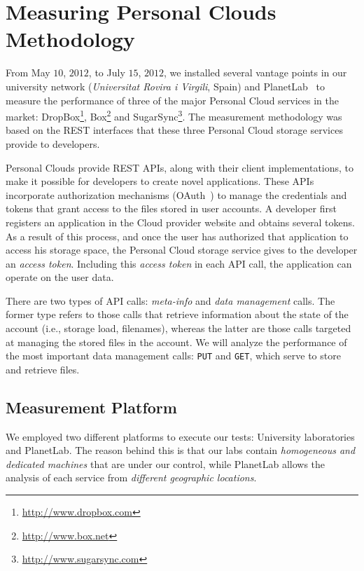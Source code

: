\chapter{Measuring Personal Clouds Methodology}

From May $10$, $2012$, to July $15$, $2012$, we installed several
vantage points in our university network (\textit{Universitat
Rovira i Virgili}, Spain) and PlanetLab~\cite{planetlab}  
to measure the performance of three of the major Personal Cloud services in the market: DropBox\footnote{\url{http://www.dropbox.com}}, Box\footnote{\url{http://www.box.net}} 
and SugarSync\footnote{\url{http://www.sugarsync.com}}. The measurement methodology was based on the REST interfaces that these three Personal Cloud storage services provide to developers.

Personal Clouds provide REST APIs, along with
their client implementations, to make it possible for developers to
create novel applications. These APIs incorporate authorization
mechanisms (OAuth~\cite{oauth}) to manage the credentials and tokens
that grant access to the files stored in user accounts. A
developer first registers an application 
in the Cloud provider website and obtains several tokens.
As a result of this process, and once the user has authorized
that application to access his storage space, the Personal Cloud storage service
gives to the developer an \textit{access token}. Including this \textit{access token} in each API call, the application can operate on the user data.

There are two types of API calls: \textit{meta-info} and
\textit{data management} calls. The former type refers to
those calls that retrieve information about the state of the
account (i.e., storage load, filenames), whereas the latter
are those calls targeted at managing the stored files
in the account. %
We will analyze the performance
of the most important data management calls: \texttt{PUT} and \texttt{GET},
which serve to store and retrieve files.  


\section{Measurement Platform} 

We employed two different platforms
to execute our tests: University laboratories and PlanetLab.
The reason behind this is that our labs contain
\textit{homogeneous and dedicated machines} that are under our control,
while PlanetLab allows the analysis of each service from \textit{different geographic locations}. 

